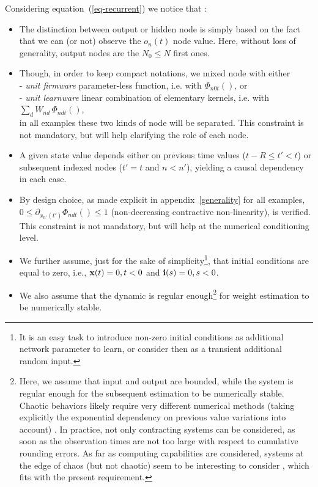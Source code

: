 Considering equation~(\ref{eq-recurrent}) we notice that : \begin{itemize}

\item The distinction between output or hidden node is simply based on the fact that we can (or not) observe the $o_n(t)$ node value. Here, without loss of generality, output nodes are the $N_0 \leq N$ first ones.

\item Though, in order to keep compact notations, we mixed node with either 
 \\ \hphantom{0.2cm} - {\em unit firmware} parameter-less function, i.e. with $\Phi_{n0t}()$, or
 \\ \hphantom{0.2cm} - {\em unit learnware} linear combination of elementary kernels, i.e. with $\sum_{d} W_{nd} \, \Phi_{ndt}()$,
\\ in all examples these two kinds of node will be separated. This constraint is not mandatory, but will help clarifying the role of each node.

\item A given state value depends either on previous time values ($t - R \leq t' < t$) or subsequent indexed nodes ($t' = t$ and $n < n'$), yielding a causal dependency in each case.

\item By design choice, as made explicit in appendix~\ref{generality} for all examples, $0 \leq \partial_{x_{n'}(t')} \Phi_{ndt}() \leq 1$ (non-decreasing contractive non-linearity), is verified. This constraint is not mandatory, but will help at the numerical conditioning level.

\item We further assume, just for the sake of simplicity\footnote{It is an easy task to introduce non-zero initial conditions as additional network parameter to learn, or consider then as a transient additional random input.}, that initial conditions are equal to zero, i.e., ${\bf x}(t) = 0, t < 0$ and ${\bf i}(s) = 0, s < 0$. 

\item We also assume that the dynamic is regular enough\footnote{Here, we assume that input and output are bounded, while the system is regular enough for the subsequent estimation to be numerically stable. Chaotic behaviors likely require very different numerical methods (taking explicitly the exponential dependency on previous value variations into account) \cite{cessac_view_2010}. In practice, not only contracting systems can be considered, as soon as the observation times are not too large with respect to cumulative rounding errors. As far as computing capabilities are considered, systems at the edge of chaos (but not chaotic) seem to be interesting to consider \cite{bertschinger-natschlager:04,Legenstein:2007}, which fits with the present requirement.} for weight estimation to be numerically stable.

\end{itemize}

